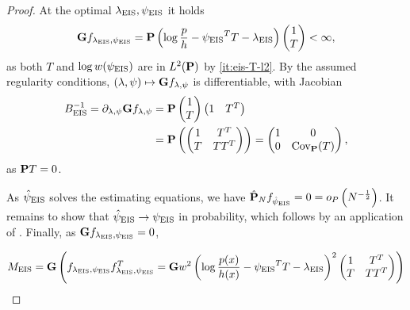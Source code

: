 \begin{proof}
    At the optimal $\lambda_{\eis}, \peis$ it holds
    \begin{align*}
    \G f_{\lambda_{\eis},\peis} = \P \left( \log \frac{p}{h} - \peis^{T}T - \lambda_{\eis}  \right) \begin{pmatrix}
        1 \\ T
    \end{pmatrix} < \infty,
    \end{align*}
    as both $T$ and $\log w(\peis)$ are in $L^{2}(\P)$ by \ref{it:eis-T-l2}.
    By the assumed regularity conditions, $(\lambda,\psi) \mapsto \G f_{\lambda, \psi}$ is differentiable, with Jacobian
    \begin{align*}
    B_{\eis}^{-1} = \partial_{\lambda,\psi}\G f_{\lambda,\psi} &= \P \begin{pmatrix}
        1 \\ T
    \end{pmatrix} \begin{pmatrix}
        1 & T^{T}
    \end{pmatrix}\\
        &= \P \left( \begin{pmatrix}
            1 & T^{T} \\
            T & TT^{T}
        \end{pmatrix} \right) = \begin{pmatrix}
            1 & 0 \\
            0 & \cov_{\P} (T)
        \end{pmatrix},
    \end{align*}
    as $\P T = 0$.

    As $\hpeis$ solves the estimating equations, we have $\hat\P_{N} f_{\hpeis} = 0 = o_{P} \left( N^{-\frac{1}{2}} \right)$. It remains to show that $\hpeis \to \peis$ in probability, which follows by an application of . 
    Finally, as $\G f_{\lambda_{\eis},\peis}=0$, 

    $$
    M_{\eis} = \G \left(f_{\lambda_{\eis},\peis} f_{\lambda_{\eis},\peis}^T = \G w^{2} \left( \log \frac{p(x)}{h(x)} - \peis^{T}T - \lambda_{\eis}\right)^{2} \begin{pmatrix}
        1 & T^{T} \\
        T & TT^{T}
    \end{pmatrix}\right)
    $$
\end{proof}

